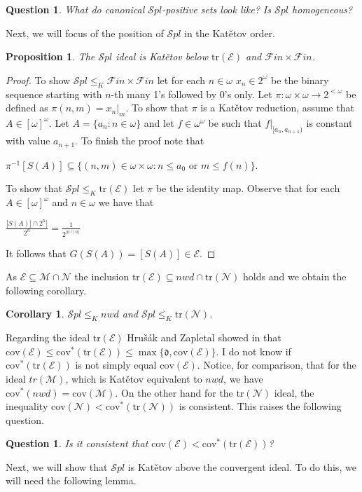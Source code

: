 \documentclass[a4paper]{amsart}
\newtheorem{proposition}[theorem]{Proposition}
\newtheorem{corollary}[theorem]{Corollary}
\newtheorem{question}[theorem]{Question}
\newcommand{\ddd}{\mathfrak{d}}
\newcommand{\Meager}{\mathcal{M}}
\newcommand{\Null}{\mathcal{N}}
\newcommand{\E}{\mathcal{E}}
\newcommand{\Baire}{\omega^{\omega}}
\newcommand{\Cantor}{2^{\omega}}
\newcommand{\cantor}{2^{<\omega}}
\newcommand{\cov}{\mathrm{cov}}
\newcommand{\FF}{\mathcal{F}in\times\mathcal{F}in}
\newcommand{\nwd}{nwd}
\newcommand{\SPL}{\mathcal{S}pl}
\newcommand{\trN}{\mathrm{tr}(\Null)}
\newcommand{\trE}{\mathrm{tr}(\E)}
\begin{document}
\begin{question}
    What do canonical $\SPL$-positive sets look like? Is $\SPL$ homogeneous?
\end{question}
Next, we will focus of the position of $\SPL$ in the Katětov order.
\begin{proposition}\label{SPLKatětovUpper}
    The $\SPL$ ideal is Katětov below $\trE$ and $\FF$.
\end{proposition}
\begin{proof}
    To show $\SPL\leq_{K}\FF$ let for each $n\in\omega$ $x_{n}\in\Cantor$ be the binary sequence starting with $n$-th many 1's followed by 0's only. Let $\pi:\omega\times\omega\rightarrow \cantor$ be defined as $\pi(n,m)=x_{n}|_{m}$. To show that $\pi$ is a Katětov reduction, assume that $A\in[\omega]^{\omega}$. Let $A=\{a_{n}:n\in\omega\}$ and let $f\in\Baire$ be such that $f|_{[a_{n},a_{n+1})}$ is constant with value $a_{n+1}$. To finish the proof note that
    \begin{center}
        $\pi^{-1}[S(A)]\subseteq\{(n,m)\in\omega\times\omega: n\leq a_{0}$ or $m\leq f(n)\}$.
    \end{center}
    To show that $\SPL\leq_{K} \trE$ let $\pi$ be the identity map. Observe that for each $A\in[\omega]^{\omega}$ and $n\in\omega$ we have that 
    \begin{center}
        $\frac{|S(A)]\cap 2^{n}|}{2^{n}}=\frac{1}{2^{|a\cap n|}}$
    \end{center}
    It follows that $G(S(A))=[S(A)]\in \E$. 
    \end{proof}
As $\E\subseteq\Meager\cap\Null$ the inclusion $\trE\subseteq\nwd\cap\trN$ holds and we obtain the following corollary.
\begin{corollary}
    $\SPL\leq_{K}\nwd$ and $\SPL\leq_{K}\trN$.
\end{corollary}
Regarding the ideal $\trE$ Hru\v{s}\'{a}k and Zapletal showed in \cite{HrusakZapletal} that $\cov(\E)\leq\cov^{*}(\trE)\leq\max\{\ddd,\cov(\E)\}$. I do not know if $\cov^{*}(\trE)$ is not simply equal $\cov(\E)$. Notice, for comparison, that for the ideal $tr(\Meager)$, which is Katětov equivalent to $\nwd$, we have $\cov^{*}(\nwd)=\cov(\Meager)$. On the other hand for the $\trN$ ideal, the inequality $\cov(\Null)<\cov^{*}(\trN)$ is consistent. This raises the following question.
\begin{question}
    Is it consistent that $\cov(\E)<\cov^{*}(\trE)$?
\end{question}
Next, we will show that $\SPL$ is Katětov above the convergent ideal. To do this, we will need the following lemma.
\end{document}
